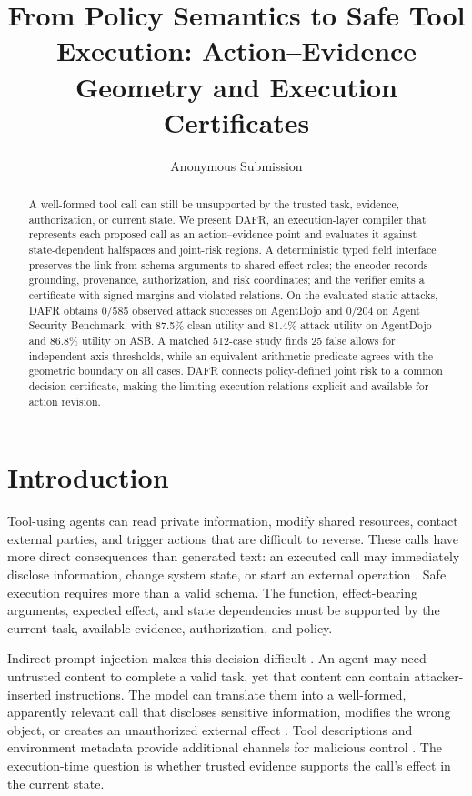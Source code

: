 \documentclass[letterpaper]{article}
\title{From Policy Semantics to Safe Tool Execution: Action--Evidence Geometry and Execution Certificates}
\author{Anonymous Submission}
\begin{document}
\maketitle

\begin{abstract}
A well-formed tool call can still be unsupported by the trusted task, evidence, authorization, or current state. We present DAFR, an execution-layer compiler that represents each proposed call as an action--evidence point and evaluates it against state-dependent halfspaces and joint-risk regions. A deterministic typed field interface preserves the link from schema arguments to shared effect roles; the encoder records grounding, provenance, authorization, and risk coordinates; and the verifier emits a certificate with signed margins and violated relations. On the evaluated static attacks, DAFR obtains 0/585 observed attack successes on AgentDojo and 0/204 on Agent Security Benchmark, with 87.5\% clean utility and 81.4\% attack utility on AgentDojo and 86.8\% utility on ASB. A matched 512-case study finds 25 false allows for independent axis thresholds, while an equivalent arithmetic predicate agrees with the geometric boundary on all cases. DAFR connects policy-defined joint risk to a common decision certificate, making the limiting execution relations explicit and available for action revision.
\end{abstract}

\section{Introduction}

Tool-using agents can read private information, modify shared resources, contact external parties, and trigger actions that are difficult to reverse. These calls have more direct consequences than generated text: an executed call may immediately disclose information, change system state, or start an external operation \citep{yao2023react,schick2023toolformer,ruan2024toolemu,ye2024toolsword,lee2026mobilesafetybench}. Safe execution requires more than a valid schema. The function, effect-bearing arguments, expected effect, and state dependencies must be supported by the current task, available evidence, authorization, and policy.

Indirect prompt injection makes this decision difficult \citep{greshake2023indirectpromptinjection,liu2023promptinjection,zhan2024injecagent}. An agent may need untrusted content to complete a valid task, yet that content can contain attacker-inserted instructions. The model can translate them into a well-formed, apparently relevant call that discloses sensitive information, modifies the wrong object, or creates an unauthorized external effect \citep{NEURIPS2024_97091a51,liao2025eia,wang2025agentvigil,li2026agentdynagentsecuritydefenses,ma2026autodojoadaptiveblackboxattacks}. Tool descriptions and environment metadata provide additional channels for malicious control \citep{wang2026mcptox}. The execution-time question is whether trusted evidence supports the call's effect in the current state.
\end{document}
